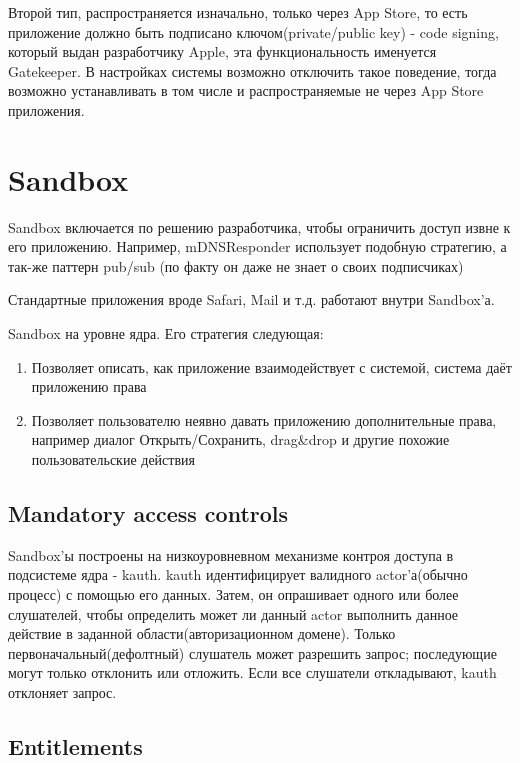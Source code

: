 \documentclass[12pt, a4paper]{article}
\begin{document}
Второй тип, распространяется изначально, только через App Store, то есть приложение должно быть подписано ключом(private/public key) - code signing, который выдан разработчику Apple, эта функциональность именуется Gatekeeper. В настройках системы возможно отключить такое поведение, тогда возможно устанавливать в том числе и распространяемые не через App Store приложения.

\section{Sandbox}

Sandbox включается по решению разработчика, чтобы ограничить доступ извне к его приложению. Например, mDNSResponder использует подобную стратегию, а так-же паттерн pub/sub (по факту он даже не знает о своих подписчиках)

Стандартные приложения вроде Safari, Mail и т.д. работают внутри Sandbox'а.

Sandbox на уровне ядра. Его стратегия следующая:

\begin{enumerate}
  \item{Позволяет описать, как приложение взаимодействует с системой, система даёт приложению права}
  \item{Позволяет пользователю неявно давать приложению дополнительные права, например диалог Открыть/Сохранить, drag&drop и другие похожие пользовательские действия}
\end{enumerate}

\subsection{Mandatory access controls}

Sandbox'ы построены на низкоуровневном механизме контроя доступа в подсистеме ядра - kauth. kauth идентифицирует валидного actor'а(обычно процесс) с помощью его данных. Затем, он опрашивает одного или более слушателей, чтобы определить может ли данный actor выполнить данное действие в заданной области(авторизационном домене). Только первоначальный(дефолтный) слушатель может разрешить запрос; последующие могут только отклонить или отложить. Если все слушатели откладывают, kauth отклоняет запрос.

\subsection{Entitlements}
\end{document}
